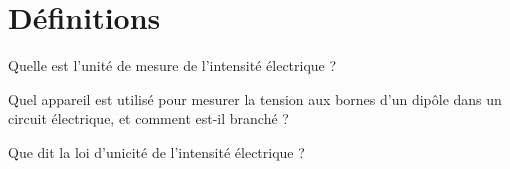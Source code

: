 \section{Définitions}


\begin{questions}
	\question Quelle est l'unité de mesure de l'intensité électrique ?
	\fillwithdottedlines{1cm}
	
	\question Quel appareil est utilisé pour mesurer la tension aux bornes d'un dipôle dans un circuit électrique, et comment est-il branché ?
	\fillwithdottedlines{1.5cm}

	\question Que dit la loi d'unicité de l'intensité électrique ?	
	\fillwithdottedlines{2cm}
	
	
\end{questions}
